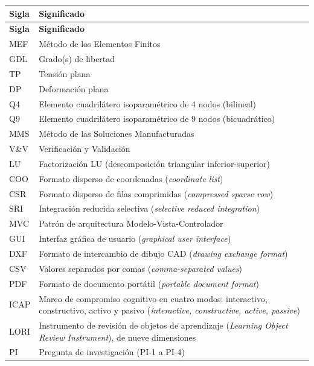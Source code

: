 \begin{longtable}{@{}p{2.4cm}p{11.4cm}@{}}
\toprule
\textbf{Sigla} & \textbf{Significado} \\
\midrule
\endfirsthead
\toprule
\textbf{Sigla} & \textbf{Significado} \\
\midrule
\endhead
\bottomrule
\endfoot
MEF & Método de los Elementos Finitos \\
GDL & Grado(s) de libertad \\
TP & Tensión plana \\
DP & Deformación plana \\
Q4 & Elemento cuadrilátero isoparamétrico de 4 nodos (bilineal) \\
Q9 & Elemento cuadrilátero isoparamétrico de 9 nodos (bicuadrático) \\
MMS & Método de las Soluciones Manufacturadas \\
V\&V & Verificación y Validación \\
LU & Factorización LU (descomposición triangular inferior-superior) \\
COO & Formato disperso de coordenadas (\emph{coordinate list}) \\
CSR & Formato disperso de filas comprimidas (\emph{compressed sparse row}) \\
SRI & Integración reducida selectiva (\emph{selective reduced integration}) \\
MVC & Patrón de arquitectura Modelo-Vista-Controlador \\
GUI & Interfaz gráfica de usuario (\emph{graphical user interface}) \\
DXF & Formato de intercambio de dibujo CAD (\emph{drawing exchange format}) \\
CSV & Valores separados por comas (\emph{comma-separated values}) \\
PDF & Formato de documento portátil (\emph{portable document format}) \\
ICAP & Marco de compromiso cognitivo en cuatro modos: interactivo, constructivo, activo y pasivo (\emph{interactive, constructive, active, passive}) \\
LORI & Instrumento de revisión de objetos de aprendizaje (\emph{Learning Object Review Instrument}), de nueve dimensiones \\
PI & Pregunta de investigación (PI-1 a PI-4) \\
\end{longtable}
\renewcommand{\arraystretch}{1.0}

\setcounter{table}{0}
